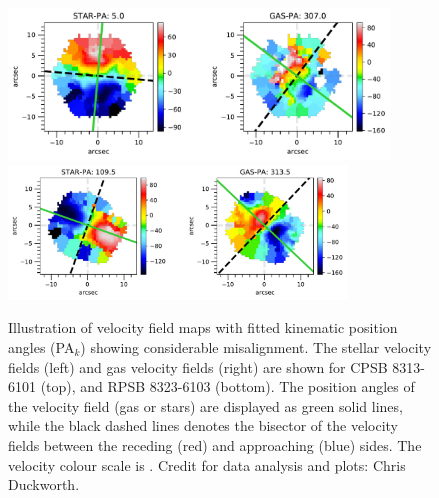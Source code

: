 \begin{figure}
    \centering
    \includegraphics[width=0.9\textwidth]{images/PAplots/PAplotsCPSB/8313-6101-PA.pdf}
    \includegraphics[width=0.8\textwidth]{images/PAplots/PAplotsRPSB/8323-6103-PA.pdf}
    \caption[Examples of PSBs showing significant kinematic PA misalignment $\Delta$PA$_{k}$: CPSB 8313-6101 and RPSB 8323-6103.]{Illustration of velocity field maps with fitted kinematic position angles (PA$_{k}$) showing considerable misalignment. The stellar velocity fields (left) and gas velocity fields (right) are shown for CPSB 8313-6101 (top), and RPSB 8323-6103 (bottom). The position angles of the velocity field (gas or stars) are displayed as green solid lines, while the black dashed lines denotes the bisector of the velocity fields between the receding (red) and approaching (blue) sides. The velocity colour scale is \kms. Credit for data analysis and plots: Chris Duckworth.}
    \label{fig:CPSB-8313-6101-PA}
\end{figure}


